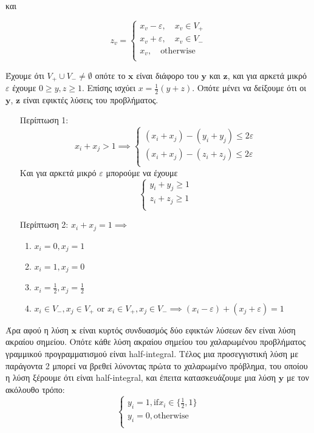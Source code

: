 και 

$$z_v = \begin{cases}
x_v - \varepsilon, \quad x_v \in V_{+}\\
x_v + \varepsilon, \quad x_v \in V_{-}\\
x_v , \quad \text{otherwise}\\
\end{cases}$$

Έχουμε ότι $V_{+}\cup V_{-} \neq \emptyset$ οπότε το $\boldsymbol{x}$ είναι διάφορο του $\boldsymbol{y}$ και $\boldsymbol{z}$, και για αρκετά μικρό $\varepsilon$
έχουμε $0 \geq y, z \geq 1$. Επίσης ισχύει $x = \frac{1}{2} (y + z)$.
Οπότε μένει να δείξουμε ότι οι $\boldsymbol{y}$, $\boldsymbol{z}$ είναι εφικτές λύσεις του προβλήματος.
\begin{enumerate}
\item[Περίπτωση 1:]
$$x_i + x_j > 1 \implies 
\begin{cases}
(x_i + x_j) - (y_i + y_j) \leq 2\varepsilon\\
(x_i + x_j) - (z_i + z_j) \leq 2\varepsilon\\
\end{cases}
$$
{\centering Και για αρκετά μικρό $\varepsilon$ μπορούμε να έχουμε}
$$ 
\begin{cases}
y_i + y_j \geq 1\\
z_i + z_j \geq 1\\
\end{cases}
$$
\item[Περίπτωση 2:]
$x_i + x_j = 1 \implies$
\begin{enumerate}
\item $x_i = 0,  x_j = 1$
\item $x_i = 1,  x_j = 0$
\item $x_i = \frac{1}{2},  x_j = \frac{1}{2}$
\item $x_i \in V_{-}, x_j \in V_{+}$ or $ x_i \in V_{+}, x_j \in V_{-} \implies (x_i - \varepsilon) + (x_j + \varepsilon) = 1$

\end{enumerate}
\end{enumerate}

Άρα αφού η λύση $\boldsymbol{x}$ είναι κυρτός συνδυασμός δύο εφικτών λύσεων δεν είναι λύση ακραίου σημείου. Οπότε κάθε λύση ακραίου σημείου του χαλαρωμένου προβλήματος γραμμικού προγραμματισμού είναι half-integral.
Τέλος μια προσεγγιστική λύση με παράγοντα 2 μπορεί να βρεθεί λύνοντας πρώτα το χαλαρωμένο πρόβλημα, του οποίου η λύση ξέρουμε ότι είναι half-integral, και έπειτα κατασκευάζουμε μια λύση $\boldsymbol{y}$ με τον ακόλουθο τρόπο:
$$
\begin{cases}
y_i = 1, \text{if} x_i \in{\{\frac{1}{2}, 1\}}\\
y_i = 0, \text{otherwise}\\
\end{cases}
$$


